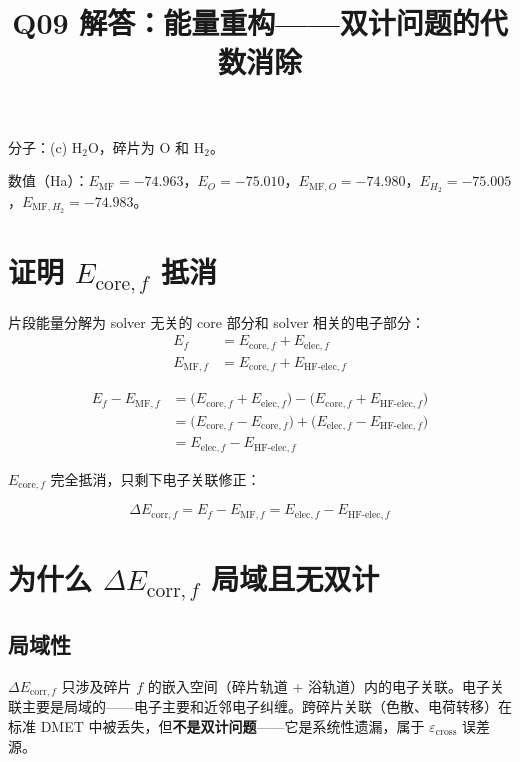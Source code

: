 \documentclass[11pt,a4paper]{article}
\title{Q09 解答：能量重构——双计问题的代数消除}
\author{}
\date{}
\begin{document}
\maketitle

分子：(c) H$_2$O，碎片为 O 和 H$_2$。

数值（Ha）：$E_{\text{MF}} = -74.963$，$E_O = -75.010$，$E_{\text{MF},O} = -74.980$，$E_{H_2} = -75.005$，$E_{\text{MF},H_2} = -74.983$。

\section{证明 $E_{\text{core},f}$ 抵消}

片段能量分解为 solver 无关的 core 部分和 solver 相关的电子部分：
\begin{align}
  E_f &= E_{\text{core},f} + E_{\text{elec},f} \\
  E_{\text{MF},f} &= E_{\text{core},f} + E_{\text{HF-elec},f}
\end{align}

\begin{align}
  E_f - E_{\text{MF},f}
  &= \big(E_{\text{core},f} + E_{\text{elec},f}\big) - \big(E_{\text{core},f} + E_{\text{HF-elec},f}\big) \\
  &= \big(E_{\text{core},f} - E_{\text{core},f}\big) + \big(E_{\text{elec},f} - E_{\text{HF-elec},f}\big) \\
  &= E_{\text{elec},f} - E_{\text{HF-elec},f}
\end{align}

$E_{\text{core},f}$ 完全抵消，只剩下电子关联修正：

\begin{equation}
  \boxed{\;\Delta E_{\text{corr},f} = E_f - E_{\text{MF},f} = E_{\text{elec},f} - E_{\text{HF-elec},f}\;}
\end{equation}

\section{为什么 $\Delta E_{\text{corr},f}$ 局域且无双计}

\subsection{局域性}

$\Delta E_{\text{corr},f}$ 只涉及碎片 $f$ 的嵌入空间（碎片轨道 + 浴轨道）内的电子关联。电子关联主要是局域的——电子主要和近邻电子纠缠。跨碎片关联（色散、电荷转移）在标准 DMET 中被丢失，但\textbf{不是双计问题}——它是系统性遗漏，属于 $\varepsilon_{\text{cross}}$ 误差源。
\end{document}
